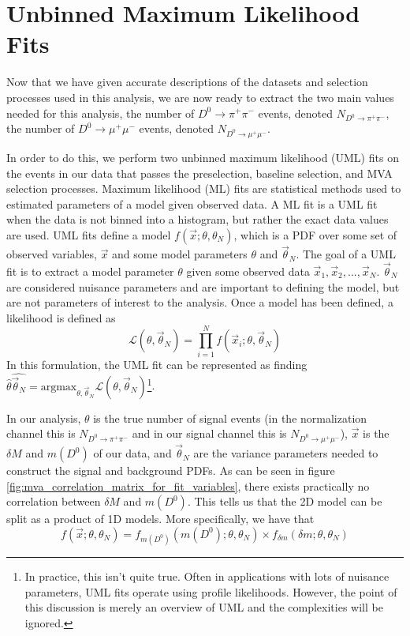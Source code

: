 \section{Unbinned Maximum Likelihood Fits}

Now that we have given accurate descriptions of the datasets and selection processes used in this analysis, we are now ready to extract the two main values needed for this analysis, the number of $D^0 \to \pi^+ \pi^-$ events, denoted $N_{D^0 \to \pi^+ \pi^-}$, the number of $D^0 \to \mu^+ \mu^-$ events, denoted $N_{D^0 \to \mu^+ \mu^-}$.

In order to do this, we perform two unbinned maximum likelihood (UML) fits on the events in our data that passes the preselection, baseline selection, and MVA selection processes. Maximum likelihood (ML) fits are statistical methods used to estimated parameters of a model given observed data. A ML fit is a UML fit when the data is not binned into a histogram, but rather the exact data values are used. UML fits define a model $f(\vec{x}; \theta, \theta_N)$, which is a PDF over some set of observed variables, $\vec{x}$ and some model parameters $\theta$ and $\vec{\theta}_N$. The goal of a UML fit is to extract a model parameter $\theta$ given some observed data $\vec{x}_1, \vec{x}_2,...,\vec{x}_N$. $\vec{\theta}_N$ are considered nuisance parameters and are important to defining the model, but are not parameters of interest to the analysis. Once a model has been defined, a likelihood is defined as
\begin{equation}
    \mathcal{L}(\theta, \vec{\theta}_N) = \prod^N_{i=1} f(\vec{x}_i; \theta, \vec{\theta}_N)
\end{equation}
In this formulation, the UML fit can be represented as finding $\hat{\theta} \hat{\vec{\theta}_N}= \text{argmax}_{\theta, \vec{\theta}_N} \mathcal{L}(\theta, \vec{\theta}_N)$\footnote{In practice, this isn't quite true. Often in applications with lots of nuisance parameters, UML fits operate using profile likelihoods. However, the point of this discussion is merely an overview of UML and the complexities will be ignored.}. 

In our analysis, $\theta$ is the true number of signal events (in the normalization channel this is $N_{D^0 \to \pi^+ \pi^-}$ and in our signal channel this is $N_{D^0 \to \mu^+ \mu^-}$), $\vec{x}$ is the $\delta M$ and $m(D^0)$ of our data, and $\vec{\theta}_N$ are the variance parameters needed to construct the signal and background PDFs. As can be seen in figure \ref{fig:mva_correlation_matrix_for_fit_variables}, there exists practically no correlation between $\delta M$ and $m(D^0)$. This tells us that the 2D model can be split as a product of 1D models. More specifically, we have that
\begin{equation}
    f(\vec{x}; \theta, \theta_N) = f_{m(D^0)}(m(D^0); \theta, \theta_N) \times f_{\delta m}(\delta m; \theta, \theta_N)
\end{equation}

